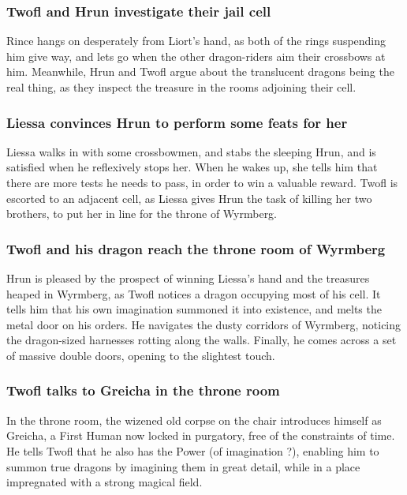 \subsubsection{\Gls{Twofl} and \Gls{Hrun} investigate their jail cell}
\Gls{Rince} hangs on desperately from \Gls{Liort}'s hand, as both of the rings suspending him
give way, and lets go when the other dragon-riders aim their crossbows at him. Meanwhile, \Gls{Hrun}
and \Gls{Twofl} argue about the translucent dragons being the real thing, as they inspect the
treasure in the rooms adjoining their cell.

\subsubsection{\Gls{Liessa} convinces \Gls{Hrun} to perform some feats for her}
\Gls{Liessa} walks in with some crossbowmen, and stabs the sleeping \Gls{Hrun}, and is satisfied
when he reflexively stops her. When he wakes up, she tells him that there are more tests he needs
to pass, in order to win a valuable reward. \Gls{Twofl} is escorted to an adjacent cell, as
\Gls{Liessa} gives \Gls{Hrun} the task of killing her two brothers, to put her in line for the
throne of Wyrmberg.

\subsubsection{\Gls{Twofl} and his dragon reach the throne room of Wyrmberg}
\Gls{Hrun} is pleased by the prospect of winning \Gls{Liessa}'s hand and the treasures heaped in
Wyrmberg, as \Gls{Twofl} notices a dragon occupying most of his cell. It tells him that his own
imagination summoned it into existence, and melts the metal door on his orders. He navigates the
dusty corridors of Wyrmberg, noticing the dragon-sized harnesses rotting along the walls. Finally,
he comes across a set of massive double doors, opening to the slightest touch.

\subsubsection{\Gls{Twofl} talks to \Gls{Greicha} in the throne room}
In the throne room, the wizened old corpse on the chair introduces himself as \Gls{Greicha}, a
First Human now locked in purgatory, free of the constraints of time. He tells \Gls{Twofl} that he
also has the Power (of imagination ?), enabling him to summon true dragons by imagining them in
great detail, while in a place impregnated with a strong magical field.

